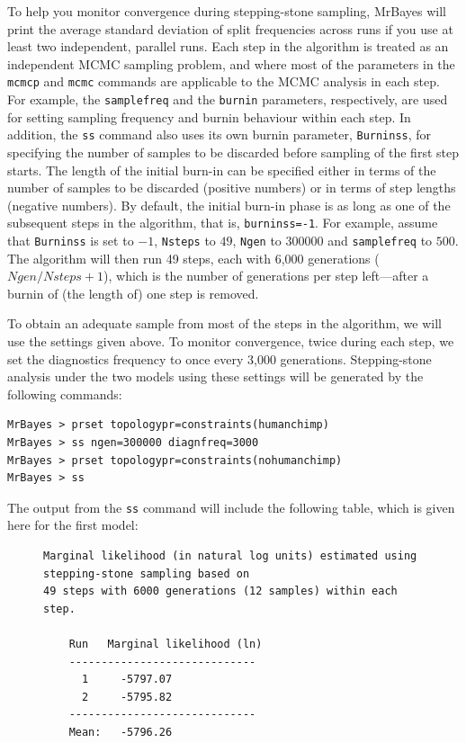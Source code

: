 \documentclass[12pt]{book}
\begin{document}
To help you monitor convergence during stepping-stone sampling, MrBayes will print the average
standard deviation of split frequencies across runs if you use at least two independent, parallel
runs. Each step in the algorithm is treated as an independent MCMC sampling problem, and where most
of the parameters in the \texttt{mcmcp} and \texttt{mcmc} commands are applicable to the MCMC
analysis in each step. For example, the \texttt{samplefreq} and the \texttt{burnin} parameters,
respectively, are used for setting sampling frequency and burnin behaviour within each step. In
addition, the \texttt{ss} command also uses its own burnin parameter, \texttt{Burninss}, for
specifying the number of samples to be discarded before sampling of the first step starts. The
length of the initial burn-in can be specified either in terms of the number of samples to be
discarded (positive numbers) or in terms of step lengths (negative numbers). By default, the
initial burn-in phase is as long as one of the subsequent steps in the algorithm, that is,
\texttt{burninss=-1}. For example, assume that \texttt{Burninss} is set to $-1$, \texttt{Nsteps} to
$49$, \texttt{Ngen} to $300000$ and \texttt{samplefreq} to $500$. The algorithm will then run 49
steps, each with 6,000 generations ($Ngen/Nsteps+1$), which is the number of generations per step
left---after a burnin of (the length of) one step is removed.

To obtain an adequate sample from most of the steps in the algorithm, we will use the settings
given above. To monitor convergence, twice during each step, we set the diagnostics frequency to
once every 3,000 generations. Stepping-stone analysis under the two models using these settings
will be generated by the following commands:

\begin{Verbatim}
MrBayes > prset topologypr=constraints(humanchimp)
MrBayes > ss ngen=300000 diagnfreq=3000
MrBayes > prset topologypr=constraints(nohumanchimp)
MrBayes > ss
\end{Verbatim}

The output from the \texttt{ss} command will include the following table, which is given here for
the first model:

\begin{figure}[h]
\centering
\begin{BVerbatim}
Marginal likelihood (in natural log units) estimated using stepping-stone sampling based on
49 steps with 6000 generations (12 samples) within each step.

    Run   Marginal likelihood (ln)
    -----------------------------
      1     -5797.07
      2     -5795.82
    -----------------------------
    Mean:   -5796.26
\end{BVerbatim}
\end{figure}
\end{document}
